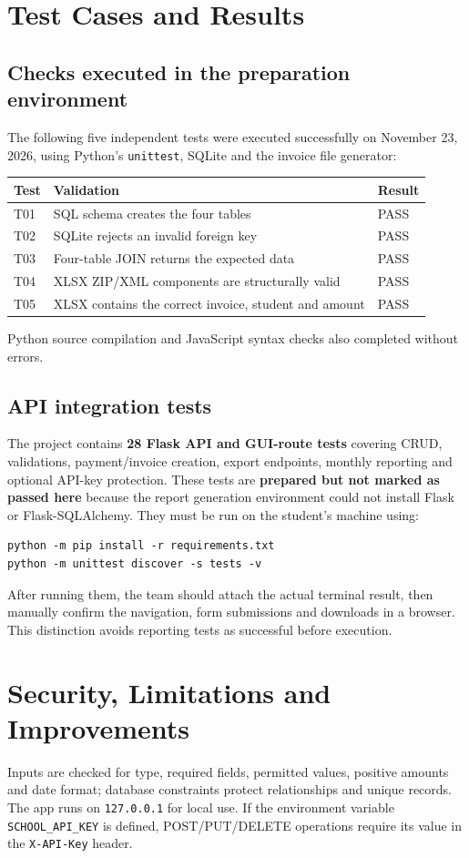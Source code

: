 \documentclass[11pt,letterpaper]{article}
\begin{document}
\section{Test Cases and Results}
\subsection{Checks executed in the preparation environment}
The following five independent tests were executed successfully on November 23, 2026, using Python's \texttt{unittest}, SQLite and the invoice file generator:
\begin{center}\begin{tabular}{p{1.1cm}p{9cm}p{2cm}}\toprule Test & Validation & Result\\\midrule
T01 & SQL schema creates the four tables & PASS\\
T02 & SQLite rejects an invalid foreign key & PASS\\
T03 & Four-table JOIN returns the expected data & PASS\\
T04 & XLSX ZIP/XML components are structurally valid & PASS\\
T05 & XLSX contains the correct invoice, student and amount & PASS\\\bottomrule\end{tabular}\end{center}
Python source compilation and JavaScript syntax checks also completed without errors.

\subsection{API integration tests}
The project contains \textbf{28 Flask API and GUI-route tests} covering CRUD, validations, payment/invoice creation, export endpoints, monthly reporting and optional API-key protection. These tests are \textbf{prepared but not marked as passed here} because the report generation environment could not install Flask or Flask-SQLAlchemy. They must be run on the student's machine using:
\begin{lstlisting}
python -m pip install -r requirements.txt
python -m unittest discover -s tests -v
\end{lstlisting}
After running them, the team should attach the actual terminal result, then manually confirm the navigation, form submissions and downloads in a browser. This distinction avoids reporting tests as successful before execution.

\section{Security, Limitations and Improvements}
Inputs are checked for type, required fields, permitted values, positive amounts and date format; database constraints protect relationships and unique records. The app runs on \texttt{127.0.0.1} for local use. If the environment variable \texttt{SCHOOL\_API\_KEY} is defined, POST/PUT/DELETE operations require its value in the \texttt{X-API-Key} header.
\end{document}
